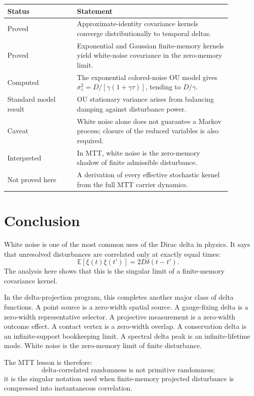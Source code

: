 \documentclass[11pt]{article}
\begin{document}
\begin{center}
\begin{tabular}{p{0.28\linewidth}p{0.62\linewidth}}
\toprule
Status & Statement \\
\midrule
Proved & Approximate-identity covariance kernels converge distributionally to temporal deltas. \\
Proved & Exponential and Gaussian finite-memory kernels yield white-noise covariance in the zero-memory limit. \\
Computed & The exponential colored-noise OU model gives \(\sigma_\tau^2=D/[\gamma(1+\gamma\tau)]\), tending to \(D/\gamma\). \\
Standard model result & OU stationary variance arises from balancing damping against disturbance power. \\
Caveat & White noise alone does not guarantee a Markov process; closure of the reduced variables is also required. \\
Interpreted & In MTT, white noise is the zero-memory shadow of finite admissible disturbance. \\
Not proved here & A derivation of every effective stochastic kernel from the full MTT carrier dynamics. \\
\bottomrule
\end{tabular}
\end{center}

\section{Conclusion}

White noise is one of the most common uses of the Dirac delta in physics. It says that unresolved disturbances are correlated only at exactly equal times:
\[
\mathbb E[\xi(t)\xi(t')]=2D\delta(t-t').
\]
The analysis here shows that this is the singular limit of a finite-memory covariance kernel.

In the delta-projection program, this completes another major class of delta functions. A point source is a zero-width spatial source. A gauge-fixing delta is a zero-width representative selector. A projective measurement is a zero-width outcome effect. A contact vertex is a zero-width overlap. A conservation delta is an infinite-support bookkeeping limit. A spectral delta peak is an infinite-lifetime mode. White noise is the zero-memory limit of finite disturbance.

The MTT lesson is therefore:
\[
\boxed{
\text{delta-correlated randomness is not primitive randomness;}
}
\]
it is the singular notation used when finite-memory projected disturbance is compressed into instantaneous correlation.
\end{document}
